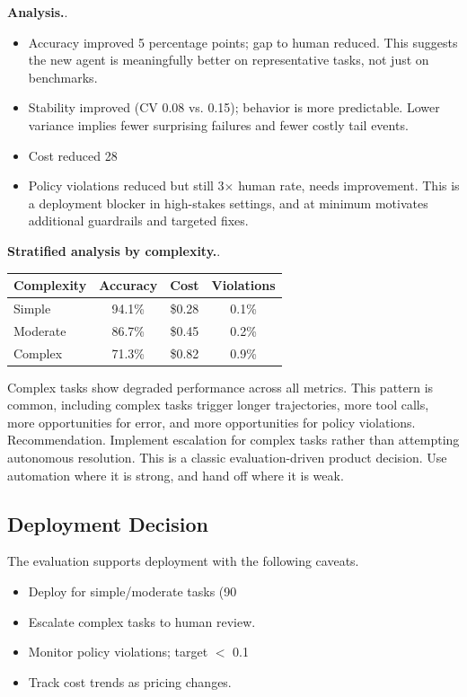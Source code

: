 \textbf{Analysis.}.
\begin{itemize}
\item Accuracy improved 5 percentage points; gap to human reduced. This suggests the new agent is meaningfully better on representative tasks, not just on benchmarks.
\item Stability improved (CV 0.08 vs. 0.15); behavior is more predictable. Lower variance implies fewer surprising failures and fewer costly tail events.
\item Cost reduced 28%
\item Policy violations reduced but still 3$\times$ human rate, needs improvement. This is a deployment blocker in high-stakes settings, and at minimum motivates additional guardrails and targeted fixes.
\end{itemize}

\textbf{Stratified analysis by complexity.}.
\begin{center}
\begin{tabular}{lccc}
\toprule
Complexity & Accuracy & Cost & Violations \\
\midrule
Simple & 94.1\% & \$0.28 & 0.1\% \\
Moderate & 86.7\% & \$0.45 & 0.2\% \\
Complex & 71.3\% & \$0.82 & 0.9\% \\
\bottomrule
\end{tabular}
\end{center}

Complex tasks show degraded performance across all metrics. This pattern is common, including complex tasks trigger longer trajectories, more tool calls, more opportunities for error, and more opportunities for policy violations. Recommendation. Implement escalation for complex tasks rather than attempting autonomous resolution. This is a classic evaluation-driven product decision. Use automation where it is strong, and hand off where it is weak.

\subsection{Deployment Decision}

The evaluation supports deployment with the following caveats.
\begin{itemize}
\item Deploy for simple/moderate tasks (90%
\item Escalate complex tasks to human review.
\item Monitor policy violations; target $<$ 0.1%
\item Track cost trends as pricing changes.
\end{itemize}

